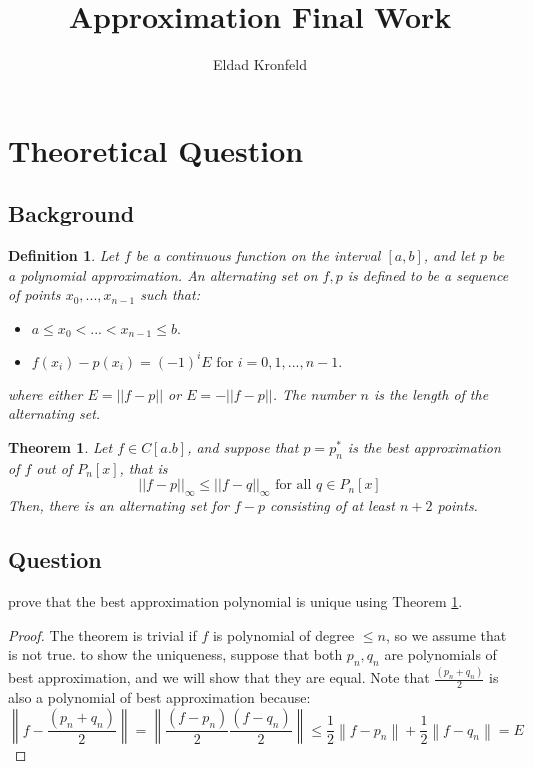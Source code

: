 \documentclass[]{article}
\title{Approximation Final Work}
\author{Eldad Kronfeld}
\date{}
\newtheorem{thm}{Theorem}[section]
\newtheorem{definition}{Definition}[]
\newcommand{\norm}[1]{\left\lVert#1\right\rVert}
\begin{document}
\maketitle
\tableofcontents


\section{Theoretical Question }
\subsection{Background}
\begin{definition}
	Let $f$ be a continuous function on the interval $[a, b]$, and let $p$ be a polynomial approximation. An alternating set on $f, p$ is defined to be a sequence of points $x_{0}, ..., x_{n-1}$ such that:
	\begin{itemize}
	\item $a \leq x_0 <...<x_{n - 1}\leq b .$
	\item $f(x_i) - p(x_i) = (-1)^i E \text{ for } i=0,1,...,n-1.$ 
\end{itemize}
where either $E=||f-p||$ or $E=-||f-p||$. The number $n$ is the length of the alternating set.
\end{definition}


\begin{thm}
	\label{thm1}
	Let $f \in C[a.b]$, and suppose that $p=p^{*}_{n}$ is the best approximation of $f$ out of $P_{n}[x]$, that is
	\begin{equation}
		||f-p||_{\infty} \le ||f-q||_{\infty} \text{ for all } q\in P_{n}[x] 
	\end{equation}
	Then, there is an alternating set for $f-p$ consisting of at least $n+2$  points.
	
\end{thm}
\subsection{Question}
prove that the best approximation polynomial is unique using Theorem \ref{thm1}. 
\begin{proof}
	The theorem is trivial if $f$ is polynomial of degree $\leq n$, so we assume that is not true. to show the uniqueness, suppose that both $p_n, q_n$ are polynomials of best approximation, and we will show that they are equal.
	Note that $\frac{(p_n + q_n)}{2}$ is also a polynomial of best approximation because:
	\begin{equation*}
		 \norm{f-\frac{(p_n + q_n)}{2}} = \norm{\frac{(f - p_n)}{2} \frac{(f - q_n)}{2}} \leq \frac{1}{2}\norm{f-p_n} + 
		 \frac{1}{2}\norm{f-q_n} = E
	\end{equation*}
\end{proof}
\end{document}
